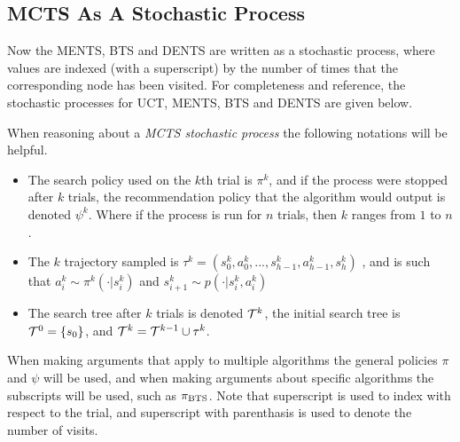 


    \subsection{MCTS As A Stochastic Process}
        Now the MENTS, BTS and DENTS are written as a stochastic process, where values are indexed (with a superscript) by the number of times that the corresponding node has been visited. For completeness and reference, the stochastic processes for UCT, MENTS, BTS and DENTS are given below.
        


        When reasoning about a \textit{MCTS stochastic process} the following notations will be helpful.
        \begin{itemize}
            \item 
                The search policy used on the $k$th trial is $\pi^k$, and if the process were stopped after $k$ trials, the recommendation policy that the algorithm would output is denoted $\psi^k$. Where if the process is run for $n$ trials, then $k$ ranges from $1$ to $n$.
            \item 
                The $k$ trajectory sampled is $\tau^k=(s_0^k,a_0^k,...,s_{h-1}^k,a_{h-1}^k,s_{h}^k)$ , and is such that $a^k_i \sim \pi^k(\cdot|s^k_i)$ and $s^k_{i+1} \sim p(\cdot | s^k_i, a^k_i)$ 
            \item 
                The search tree after $k$ trials is denoted $\mathcal{T}^k$, the initial search tree is $\mathcal{T}^0=\{s_0\}$, and $\mathcal{T}^k = \mathcal{T}^{k-1} \cup \tau^k$.
        \end{itemize}

        When making arguments that apply to multiple algorithms the general policies $\pi$ and $\psi$ will be used, and when making arguments about specific algorithms the subscripts will be used, such as ${\pi_{{\textnormal{BTS}}}}$. Note that superscript is used to index with respect to the trial, and superscript with parenthasis is used to denote the number of visits.



        
